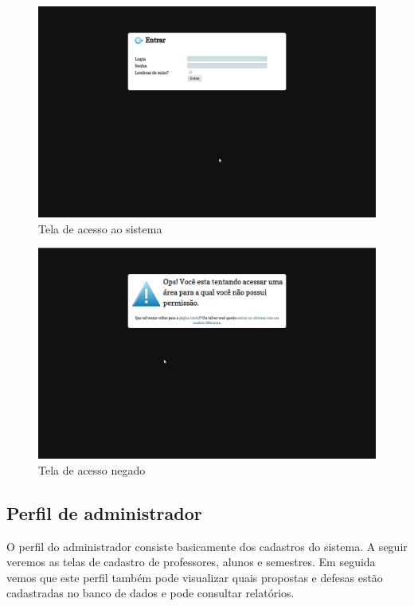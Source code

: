 \begin{figure}[htbp]
\centering
\includegraphics[width=1\textwidth]{fig/telas/login.png}
\caption{Tela de acesso ao sistema}
\label{fig:tela_login}
\end{figure}

\begin{figure}[htbp]
\centering
\includegraphics[width=1\textwidth]{fig/telas/acesso_negado.png}
\caption{Tela de acesso negado}
\label{fig:tela_acesso_negado}
\end{figure}


\subsection{Perfil de administrador}
O perfil do administrador consiste basicamente dos cadastros do sistema. A seguir veremos as
telas de cadastro de professores, alunos e semestres. Em seguida vemos que este perfil também
pode visualizar quais propostas e defesas estão cadastradas no banco de dados e pode 
consultar relatórios.

